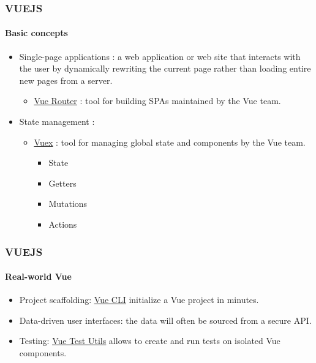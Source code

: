 \documentclass[10pt]{beamer}
\begin{document}
\begin{frame}
    \frametitle{\textbf{VUEJS}}
    \framesubtitle{\textbf{Basic concepts}}
    \begin{itemize}
        \item Single-page applications : a web application or web site that interacts
             with the user by dynamically rewriting the current page rather than loading
             entire new pages from a server.
             \begin{itemize}
                 \item \href{https://router.vuejs.org/}{\underline{Vue Router}} : tool for building SPAs maintained by the Vue team.
             \end{itemize}
        \item State management : 
        \begin{itemize}
            \item \href{https://vuex.vuejs.org/}{\underline{Vuex}} : tool for managing global state and components by the Vue team.
            \begin{itemize}
                \item State
                \item Getters
                \item Mutations
                \item Actions
            \end{itemize}
        \end{itemize}
    \end{itemize}
\end{frame}
\begin{frame}
    \frametitle{\textbf{VUEJS}}
    \framesubtitle{\textbf{Real-world Vue}}
    \begin{itemize}
        \item Project scaffolding: \href{https://cli.vuejs.org/}{\underline{Vue CLI}} initialize a Vue project in minutes. 
        \item Data-driven user interfaces: the data will often be sourced from a secure API.
        \item Testing: \href{https://vue-test-utils.vuejs.org/}{\underline{Vue Test Utils}} allows to create and run tests on isolated Vue components.
    \end{itemize}
\end{frame}
\end{document}
